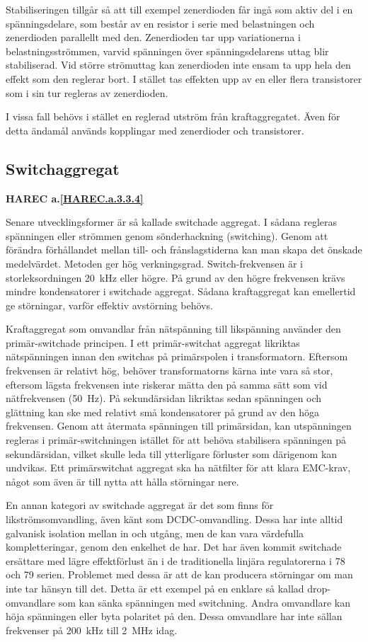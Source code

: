 Stabiliseringen tillgår så att till exempel zenerdioden får ingå som aktiv del
i en spänningsdelare, som består av en resistor i serie med belastningen och
zenerdioden parallellt med den.
Zenerdioden tar upp variationerna i belastningsströmmen, varvid spänningen över
spänningsdelarens uttag blir stabiliserad.
Vid större strömuttag kan zenerdioden inte ensam ta upp hela den effekt som den
reglerar bort.
I stället tas effekten upp av en eller flera transistorer som i sin tur
regleras av zenerdioden.

I vissa fall behövs i stället en reglerad utström från kraftaggregatet.
Även för detta ändamål används kopplingar med zenerdioder och transistorer.

\subsection{Switchaggregat}
\textbf{HAREC a.\ref{HAREC.a.3.3.4}\label{myHAREC.a.3.3.4}}

Senare utvecklingsformer är så kallade switchade aggregat.
I sådana regleras spänningen eller strömmen genom sönderhackning (switching).
Genom att förändra förhållandet mellan till- och frånslagstiderna kan man skapa
det önskade medelvärdet.
Metoden ger hög verkningsgrad.
Switch-frekvensen är i storleksordningen 20~kHz eller högre.
På grund av den högre frekvensen krävs mindre kondensatorer i switchade
aggregat.
Sådana kraftaggregat kan emellertid ge störningar, varför effektiv avstörning
behövs.

Kraftaggregat som omvandlar från nätspänning till likspänning använder
den primär-switchade principen.
I ett primär-switchat aggregat likriktas nätspänningen innan den switchas på
primärspolen i transformatorn.
Eftersom frekvensen är relativt hög, behöver transformatorns kärna inte
vara så stor, eftersom lägsta frekvensen inte riskerar mätta den på samma
sätt som vid nätfrekvensen (50~Hz).
På sekundärsidan likriktas sedan spänningen och glättning kan ske med relativt
små kondensatorer på grund av den höga frekvensen.
Genom att återmata spänningen till primärsidan, kan utspänningen regleras i
primär-switchningen istället för att behöva stabilisera spänningen på
sekundärsidan, vilket skulle leda till ytterligare förluster som därigenom kan
undvikas.
Ett primärswitchat aggregat ska ha nätfilter för att klara EMC-krav, något som
även är till nytta att hålla störningar nere.

En annan kategori av switchade aggregat är det som finns för
likströmsomvandling, även känt som DCDC-omvandling.
Dessa har inte alltid galvanisk isolation mellan in och utgång, men de kan vara
värdefulla kompletteringar, genom den enkelhet de har.
Det har även kommit switchade ersättare med lägre effektförlust än i de
traditionella linjära regulatorerna i 78 och 79 serien.
Problemet med dessa är att de kan producera störningar om man inte tar hänsyn
till det.
Detta är ett exempel på en enklare så kallad drop-omvandlare som kan sänka
spänningen med switchning.
Andra omvandlare kan höja spänningen eller byta polaritet på den.
Dessa omvandlare har inte sällan frekvenser på 200~kHz till 2~MHz idag.

